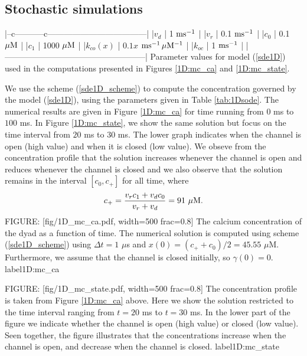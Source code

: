 \subsection{Stochastic simulations}

|--c-----------c------------------------------------|
|$v_d $       | 1 $\rm{ms^{-1}}$                    |
|$v_r $       | 0.1 $\rm{ms^{-1}}$                  |
|$c_0 $       | 0.1 $\rm{\mu M}$                    |
|$c_1 $       | 1000 $\rm{\mu M}$                   |
|$k_{co}(x) $ | $0.1x$ $\rm{ms^{-1}\, \mu M^{-1}} $ |
|$k_{oc} $    | 1 $\rm{ms^{-1}}$                    |
|---------------------------------------------------|
Parameter values for model (\ref{sde1D}) used in the computations
presented in Figures \ref{1D:mc_ca} and \ref{1D:mc_state}. \label{tab:1Dsode}

We use the scheme (\ref{sde1D_scheme}) to compute the concentration governed by the model  (\ref{sde1D}),
using the parameters given in Table \ref{tab:1Dsode}.
The numerical results are given in Figure 
\ref{1D:mc_ca} for time running from $0$ ms to $100$ ms. In Figure  \ref{1D:mc_state}, we show the same solution but focus on the time interval from $20$ ms to $30$ ms. The lower graph indicates when the channel is open (high value) and when it is closed (low value). We obseve from the concentration profile that the solution increases whenever the channel is open and reduces whenever the channel is closed and we also observe that the solution remains in the interval $[c_{0} ,c_{+}]$ for all time, where
\[
c_{+}=\frac{v_{r}c_{1}+v_{d}c_{0}}{v_{r}+v_{d}}=91\text{ }\rm{\mu M}.
\]
FIGURE: [fig/1D_mc_ca.pdf, width=500 frac=0.8] The calcium concentration of the dyad as a function of time. The numerical solution is computed using scheme  (\ref{sde1D_scheme}) using $\Delta t =1$ $\mu$s and
$x(0) = (c_{+} +c_0)/2 = 45.55$ $\mu$M. Furthermore, we assume that the channel is closed initially, so $\gamma(0)=0$.  label{1D:mc_ca}%


FIGURE: [fig/1D_mc_state.pdf, width=500 frac=0.8]  The concentration profile is taken from Figure \ref{1D:mc_ca} above. Here we show the solution restricted to the time interval ranging from $t=20$ ms to $t=30$ ms. In the lower part of the figure we indicate whether the channel is open (high value) or closed (low value). Seen together, the figure illustrates that the concentrations increase when the channel is open, and decrease when the channel is closed.   label{1D:mc_state}

